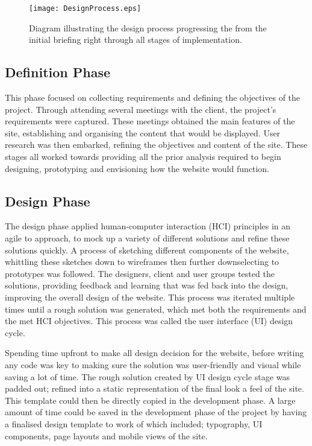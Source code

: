 \documentclass[fontsize=11pt]{extarticle}
\numberwithin{figure}{section} %
\numberwithin{table}{section}%
\begin{document}
\begin{figure}[H]
\centering
\texttt{[image: DesignProcess.eps]}
\caption{Diagram illustrating the design process progressing the from the initial briefing right through all stages of implementation.}
\label{designprocess}
\end{figure}

\hypertarget{definition-phase}{%
\subsection{Definition Phase}\label{definition-phase}}

This phase focused on collecting requirements and defining the
objectives of the project. Through attending several meetings with the
client, the project's requirements were captured. These meetings
obtained the main features of the site, establishing and organising the
content that would be displayed. User research was then embarked,
refining the objectives and content of the site. These stages all worked
towards providing all the prior analysis required to begin designing,
prototyping and envisioning how the website would function.

\hypertarget{design-phase}{%
\subsection{Design Phase}\label{design-phase}}

The design phase applied human-computer interaction (HCI) principles in
an agile to approach, to mock up a variety of different solutions and
refine these solutions quickly. A process of sketching different
components of the website, whittling these sketches down to wireframes
then further downselecting to prototypes was followed. The designers,
client and user groups tested the solutions, providing feedback and
learning that was fed back into the design, improving the overall design
of the website. This process was iterated multiple times until a rough
solution was generated, which met both the requirements and the met HCI
objectives. This process was called the user interface (UI) design
cycle.

Spending time upfront to make all design decision for the website,
before writing any code was key to making sure the solution was
user-friendly and visual while saving a lot of time. The rough solution
created by UI design cycle stage was padded out; refined into a static
representation of the final look a feel of the site. This template could
then be directly copied in the development phase. A large amount of time
could be saved in the development phase of the project by having a
finalised design template to work of which included; typography, UI
components, page layouts and mobile views of the site.
\end{document}
